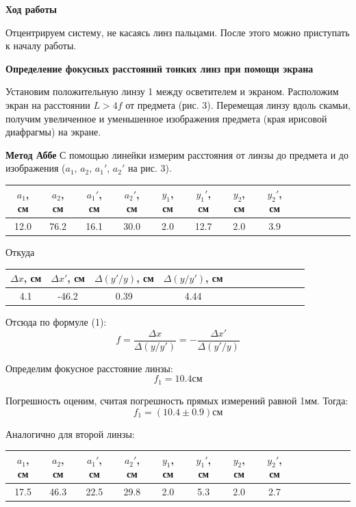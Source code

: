 \documentclass[14pt]{article}
\begin{document}
\clearpage

\textbf{Ход работы}

Отцентрируем систему, не касаясь линз пальцами. После этого можно приступать к началу работы.

\textbf{Определение фокусных расстояний тонких линз при помощи экрана} 

Установим положительную линзу 1 между осветителем
и экраном.
Расположим экран на расстоянии
$L > 4f$ от предмета (рис. 3). Перемещая
линзу вдоль скамьи, получим увеличенное
и уменьшенное изображения предмета (края ирисовой диафрагмы) на экране.


\textbf{Метод Аббе}
С помощью линейки измерим расстояния от линзы до предмета
и до изображения ($a_1$, $a_2$, $a_1'$, $a_2'$ на рис. 3).

\begin{center}
\begin{tabular}{|c|c|c|c|c|c|c|c|c|c|c|c|c|c|}
\hline
$a_1$, см	&	$a_2$, см	&	$a_1'$, см	&	$a_2'$, см	&	$y_1$, см	&	$y_1'$, см	&	$y_2$, см	&	$y_2'$, см	\\
\hline
12.0		&	76.2		&	16.1		&	30.0		&	2.0			&	12.7		&	2.0			&	3.9			\\
\hline
\end{tabular}
\end{center}

Откуда
\begin{center}
\begin{tabular}{|c|c|c|c|c|c|c|c|c|c|c|c|}
\hline
$\Delta x$, см	&	$\Delta x'$, см	&	$\Delta(y'/y)$, см	&	$\Delta(y/y')$, см	\\
\hline
4.1				&	-46.2			&	0.39				&	4.44				\\
\hline
\end{tabular}
\end{center}

Отсюда по формуле (1):
$$
	f = \frac{\Delta x}{\Delta(y/y')} = -\frac{\Delta x'}{\Delta (y'/y)}
$$

Определим фокусное расстояние линзы:
$$
	f_1 = 10.4\text{см}
$$

Погрешность оценим, считая погрешность прямых измерений равной 1мм. Тогда:
$$
	f_1 = (10.4 \pm 0.9)\text{см}
$$

Аналогично для второй линзы:

\begin{center}
\begin{tabular}{|c|c|c|c|c|c|c|c|c|c|c|c|c|c|}
\hline
$a_1$, см	&	$a_2$, см	&	$a_1'$, см	&	$a_2'$, см	&	$y_1$, см	&	$y_1'$, см	&	$y_2$, см	&	$y_2'$, см	\\
\hline
17.5		&	46.3		&	22.5		&	29.8		&	2.0			&	5.3			&	2.0			&	2.7			\\
\hline
\end{tabular}
\end{center}
\end{document}
